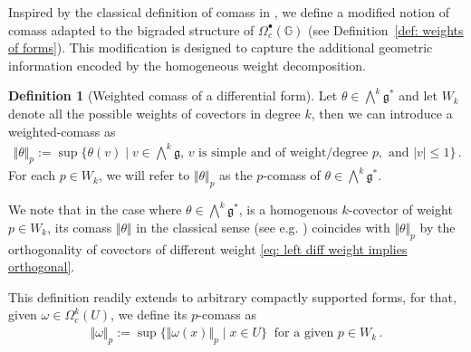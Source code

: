 \documentclass[dvipsnames]{amsart}
\theoremstyle{definition}
\newtheorem{definition}[theorem]{Definition}
\theoremstyle{definition}
\numberwithin{equation}{section}
\newcommand{\G}{\mathbb{G}}
\begin{document}
Inspired by the classical definition of comass in \cite{Federer69}, we define a modified notion of comass adapted to the bigraded structure of $\Omega^\bullet_c(\G)$ (see Definition~\ref{def: weights of forms}). This modification is designed to capture the additional geometric information encoded by the homogeneous weight decomposition.

\begin{definition}[Weighted comass of a differential form]\label{def:weightedcomass}   Let $\theta\in\bigwedge^k\mathfrak{g}^\ast$ and let $W_k$ denote all the possible weights of covectors in degree $k$, then we can introduce a weighted-comass as
\begin{align*}
    \Vert\theta\Vert_p:=\sup\{\theta(v)\mid v\in\bigwedge\nolimits^k\mathfrak{g},\,v\text{ is simple and of weight/degree }p,\text{ and }\vert v\vert\le 1\}\,.
\end{align*}
For each $p\in W_k$, we will refer to $\Vert\theta\Vert_p$ as the $p$-comass of $\theta\in\bigwedge^k\mathfrak{g}^\ast$.

We note that in the case where $\theta\in\bigwedge^k\mathfrak{g}^\ast$, is a homogenous $k$-covector of weight $p\in W_k$, its comass $\Vert\theta\Vert$ in the classical sense (see e.g. \cite[Subection 1.8.1]{Federer69}) coincides with $\Vert\theta\Vert_p$ by the orthogonality of covectors of different weight \eqref{eq: left diff weight implies orthogonal}.

This definition readily extends to arbitrary compactly supported forms, for that, given $\omega\in\Omega^k_c(U)$, we define its $p$-comass as
\begin{align*}
    \Vert\omega\Vert_p :=\sup\{\Vert\omega(x)\Vert_p\mid x\in U\}\ \text{ for a given }p\in W_k\,.
\end{align*}

\end{definition}
\end{document}
